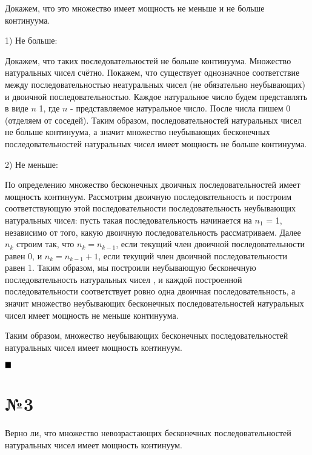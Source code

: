 \documentclass[a4paper, 16pt]{article}
\newenvironment{proof}[1][Доказательство]{%
	\begin{trivlist}
		\item[\hskip \labelsep {\bfseries #1:}]
		\item \hspace{14pt}
	}{
		$ \hfill\blacksquare $
	\end{trivlist}
	\hfill\break
}
\begin{document}
		\begin{proof}
			Докажем, что это множество имеет мощность не меньше и не больше континуума.
			
			1) Не больше:
			
			Докажем, что таких  последовательностей не больше континуума. Множество натуральных чисел счётно. Покажем, что существует однозначное соответствие между последовательностью неатуральных чисел (не обязательно неубывающих) и двоичной последовательностью. Каждое натуральное число будем представлять в виде $n$ 1, где $n$ - представляемое натуральное число. После числа пишем 0 (отделяем от соседей). Таким образом, последовательностей натуральных чисел не больше континуума, а значит множество неубывающих бесконечных последовательностей натуральных чисел имеет мощность не больше континуума.
			
			2) Не меньше:
			
			 По определению множество бесконечных двоичных последовательностей имеет мощность континуум. Рассмотрим двоичную последовательность и построим соответствующую этой последовательности последовательность неубывающих натуральных чисел: пусть такая последовательность начинается на $n_1$ = 1, независимо от того, какую двоичную последовательность рассматриваем. Далее $n_k$ строим так, что $n_k = n_{k-1}$, если текущий член двоичной последовательности равен 0, и $n_k = n_{k-1} + 1$, если текущий член двоичной последовательности равен 1. Таким образом, мы построили неубывающую бесконечную последовательность натуральных чисел , и каждой построенной последовательности соответствует ровно одна двоичная последовательность, а значит множество неубывающих бесконечных последовательностей натуральных чисел имеет мощность не меньше континуума.
			 
			 Таким образом, множество неубывающих бесконечных последовательностей натуральных чисел имеет
			 мощность континуум.
		\end{proof}
		
	\section*{№3}
	
		Верно ли, что множество невозрастающих бесконечных последовательностей натуральных чисел имеет мощность континуум.
		
\end{document}
